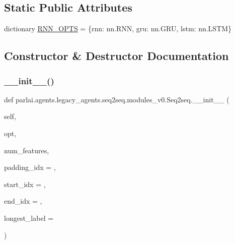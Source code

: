 \subsection*{Static Public Attributes}
\begin{DoxyCompactItemize}
\item 
dictionary \hyperlink{classparlai_1_1agents_1_1legacy__agents_1_1seq2seq_1_1modules__v0_1_1Seq2seq_af1a1661b40d32cbcfcf82f951fc46d16}{R\+N\+N\+\_\+\+O\+P\+TS} = \{\textquotesingle{}rnn\textquotesingle{}\+: nn.\+R\+NN, \textquotesingle{}gru\textquotesingle{}\+: nn.\+G\+RU, \textquotesingle{}lstm\textquotesingle{}\+: nn.\+L\+S\+TM\}
\end{DoxyCompactItemize}


\subsection{Constructor \& Destructor Documentation}
\mbox{\label{classparlai_1_1agents_1_1legacy__agents_1_1seq2seq_1_1modules__v0_1_1Seq2seq_a18cac7233148ad9fd4e6a0ea290d4dbc}} 
\subsubsection{\texorpdfstring{\+\_\+\+\_\+init\+\_\+\+\_\+()}{\_\_init\_\_()}}
{\footnotesize\ttfamily def parlai.\+agents.\+legacy\+\_\+agents.\+seq2seq.\+modules\+\_\+v0.\+Seq2seq.\+\_\+\+\_\+init\+\_\+\+\_\+ (\begin{DoxyParamCaption}\item[{}]{self,  }\item[{}]{opt,  }\item[{}]{num\+\_\+features,  }\item[{}]{padding\+\_\+idx = {},  }\item[{}]{start\+\_\+idx = {},  }\item[{}]{end\+\_\+idx = {},  }\item[{}]{longest\+\_\+label = {} }\end{DoxyParamCaption})}



